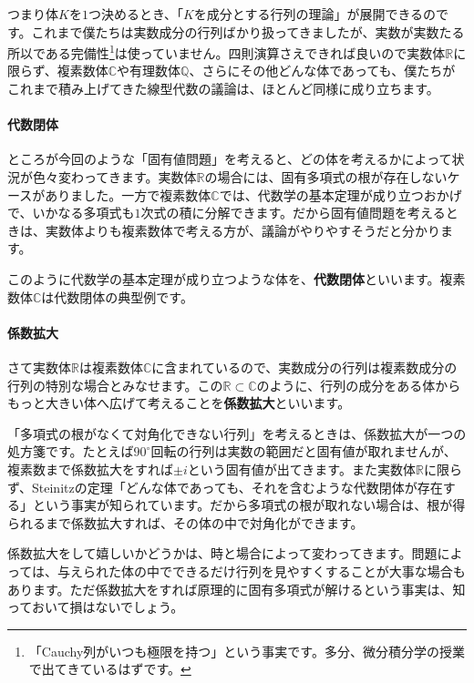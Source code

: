 つまり体$K$を$1$つ決めるとき、「$K$を成分とする行列の理論」が展開できるのです。これまで僕たちは実数成分の行列ばかり扱ってきましたが、実数が実数たる所以である完備性\footnote{「Cauchy列がいつも極限を持つ」という事実です。多分、微分積分学の授業で出てきているはずです。}は使っていません。四則演算さえできれば良いので実数体$\mathbb{R}$に限らず、複素数体$\mathbb{C}$や有理数体$\mathbb{Q}$、さらにその他どんな体であっても、僕たちがこれまで積み上げてきた線型代数の議論は、ほとんど同様に成り立ちます。

\paragraph{代数閉体}

ところが今回のような「固有値問題」を考えると、どの体を考えるかによって状況が色々変わってきます。実数体$\mathbb{R}$の場合には、固有多項式の根が存在しないケースがありました。一方で複素数体$\mathbb{C}$では、代数学の基本定理が成り立つおかげで、いかなる多項式も$1$次式の積に分解できます。だから固有値問題を考えるときは、実数体よりも複素数体で考える方が、議論がやりやすそうだと分かります。

このように代数学の基本定理が成り立つような体を、\textbf{代数閉体}といいます。複素数体$\mathbb{C}$は代数閉体の典型例です。

\paragraph{係数拡大}

さて実数体$\mathbb{R}$は複素数体$\mathbb{C}$に含まれているので、実数成分の行列は複素数成分の行列の特別な場合とみなせます。この$\mathbb{R} \subset \mathbb{C}$のように、行列の成分をある体からもっと大きい体へ広げて考えることを\textbf{係数拡大}といいます。

「多項式の根がなくて対角化できない行列」を考えるときは、係数拡大が一つの処方箋です。たとえば$90^{\circ}$回転の行列は実数の範囲だと固有値が取れませんが、複素数まで係数拡大をすれば$\pm i$という固有値が出てきます。また実数体$\mathbb{R}$に限らず、Steinitzの定理「どんな体であっても、それを含むような代数閉体が存在する」という事実が知られています。だから多項式の根が取れない場合は、根が得られるまで係数拡大すれば、その体の中で対角化ができます。

係数拡大をして嬉しいかどうかは、時と場合によって変わってきます。問題によっては、与えられた体の中でできるだけ行列を見やすくすることが大事な場合もあります。ただ係数拡大をすれば原理的に固有多項式が解けるという事実は、知っておいて損はないでしょう。

